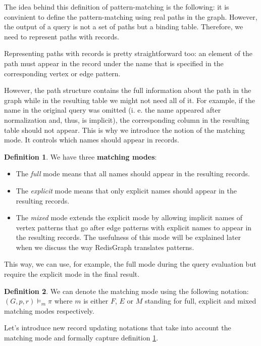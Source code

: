 \documentclass[14pt]{constructor-thesis}
\theoremstyle{definition}
\newtheorem{definition}{Definition}
\begin{document}
The idea behind this definition of pattern-matching is the following: it is convinient to define the pattern-matching using real paths in the graph. However, the output of a query is not a set of paths but a binding table. Therefore, we need to represent paths with records.

Representing paths with records is pretty straightforward too: an element of the path must appear in the record under the name that is specified in the corresponding vertex or edge pattern.

However, the path structure contains the full information about the path in the graph while in the resulting table we might not need all of it. For example, if the name in the original query was omitted (i. e. the name appeared after normalization and, thus, is implicit), the corresponding column in the resulting table should not appear. This is why we introduce the notion of the matching mode. It controls which names should appear in records.

\begin{definition}
  \label{def:matching-modes}
  We have three \textbf{matching modes}:
  \begin{itemize}
    \item The \textit{full} mode means that all names should appear in the resulting records.
    \item The \textit{explicit} mode means that only explicit names should appear in the resulting records.
    \item The \textit{mixed} mode extends the explicit mode by allowing implicit names of vertex patterns that go after edge patterns with explicit names to appear in the resulting records. The usefulness of this mode will be explained later when we discuss the way RedisGraph translates patterns.
  \end{itemize} 
\end{definition}

This way, we can use, for example, the full mode during the query evaluation but require the explicit mode in the final result.

\begin{definition}
  We can denote the matching mode using the following notation:
  $ (G, p, r) \models_m \pi $
  where $m$ is either $F$, $E$ or $M$ standing for full, explicit and mixed matching modes respectively.
\end{definition}

Let's introduce new record updating notations that take into account the matching mode and formally capture definition \ref{def:matching-modes}.
\end{document}
